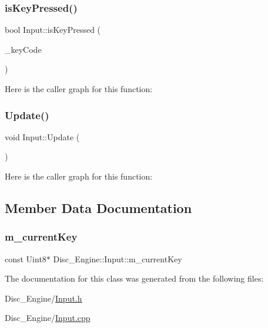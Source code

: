 \mbox{\label{class_disc___engine_1_1_input_ad3455de83698aa34630444c4b0e5d404}} 
\subsubsection{\texorpdfstring{is\+Key\+Pressed()}{isKeyPressed()}}
{\footnotesize\ttfamily bool Input\+::is\+Key\+Pressed (\begin{DoxyParamCaption}\item[{S\+D\+L\+\_\+\+Scancode}]{\+\_\+key\+Code }\end{DoxyParamCaption})}

Here is the caller graph for this function\+:
\mbox{\label{class_disc___engine_1_1_input_af80dcfde6dbfe39bf3bc0345c75595ce}} 
\subsubsection{\texorpdfstring{Update()}{Update()}}
{\footnotesize\ttfamily void Input\+::\+Update (\begin{DoxyParamCaption}{ }\end{DoxyParamCaption})}

Here is the caller graph for this function\+:


\subsection{Member Data Documentation}
\mbox{\label{class_disc___engine_1_1_input_aefcdc94a751a9820f9e94837a82133fa}} 
\subsubsection{\texorpdfstring{m\+\_\+current\+Key}{m\_currentKey}}
{\footnotesize\ttfamily const Uint8$\ast$ Disc\+\_\+\+Engine\+::\+Input\+::m\+\_\+current\+Key\hspace{0.3cm}{\ttfamily [private]}}



The documentation for this class was generated from the following files\+:\begin{DoxyCompactItemize}
\item 
Disc\+\_\+\+Engine/\mbox{\hyperlink{_input_8h}{Input.\+h}}\item 
Disc\+\_\+\+Engine/\mbox{\hyperlink{_input_8cpp}{Input.\+cpp}}\end{DoxyCompactItemize}

